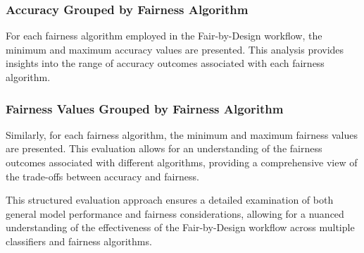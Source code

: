 \subsubsection{Accuracy Grouped by Fairness Algorithm}

For each fairness algorithm employed in the Fair-by-Design workflow, the minimum and maximum accuracy values are presented. This analysis provides insights into the range of accuracy outcomes associated with each fairness algorithm.


\subsubsection{Fairness Values Grouped by Fairness Algorithm}

Similarly, for each fairness algorithm, the minimum and maximum fairness values are presented. This evaluation allows for an understanding of the fairness outcomes associated with different algorithms, providing a comprehensive view of the trade-offs between accuracy and fairness.

This structured evaluation approach ensures a detailed examination of both general model performance and fairness considerations, allowing for a nuanced understanding of the effectiveness of the Fair-by-Design workflow across multiple classifiers and fairness algorithms.